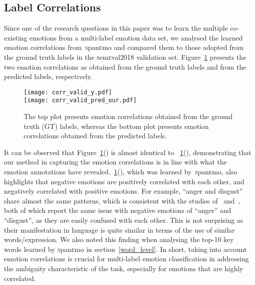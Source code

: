 \documentclass[11pt,a4paper]{article}
\begin{document}
\subsection{Label Correlations}

Since one of the research questions in this paper was to learn the multiple co-existing emotions from a multi-label emotion data set, we analysed the learned emotion correlations from~\textsc{s}pan\textsc{e}mo and compared them to those adopted from the ground truth labels in the \textsc{s}em\textsc{e}val2018 validation set. Figure~\ref{label_corr} presents the two emotion correlations as obtained from the ground truth labels and from the predicted labels, respectively. 

\begin{figure}[!th]
\centering
{}
{\texttt{[image: corr\_valid\_y.pdf]}} \\
{\texttt{[image: corr\_valid\_pred\_our.pdf]}}
\caption{The top plot presents emotion correlations obtained from the ground truth (GT) labels, whereas the bottom plot presents emotion correlations obtained from the predicted labels.}\label{label_corr}
\end{figure}




It can be observed that Figure~\ref{label_corr}() is almost identical to ~\ref{label_corr}(), demonstrating that our method in capturing the emotion correlations is in line with what the emotion annotations have revealed.~\ref{label_corr}(), which was learned by~\textsc{s}pan\textsc{e}mo, also highlights that negative emotions are positively correlated with each other, and negatively correlated with positive emotions. For example, ``anger and disgust'' share almost the same patterns, which is consistent with the studies of~ and~, both of which report the same issue with negative emotions of “anger” and “disgust”, as they are easily confused with each other. This is not surprising as their manifestation in language is quite similar in terms of the use of similar words/expression. We also noted this finding when analysing the top-10 key words learned by \textsc{s}pan\textsc{e}mo in section~\ref{word_level}. In short, taking into account emotion correlations is crucial for multi-label emotion classification in addressing the ambiguity characteristic of the task, especially for emotions that are highly correlated.  
\end{document}
